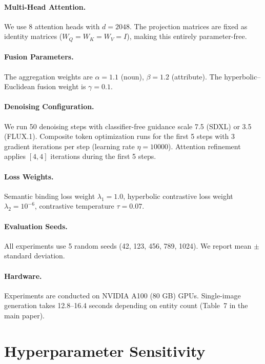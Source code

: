 \documentclass[sigconf,nonacm]{acmart}
\begin{document}
\paragraph{Multi-Head Attention.} We use 8 attention heads with $d=2048$. The projection matrices are fixed as identity matrices ($W_Q = W_K = W_V = I$), making this entirely parameter-free.

\paragraph{Fusion Parameters.} The aggregation weights are $\alpha = 1.1$ (noun), $\beta = 1.2$ (attribute). The hyperbolic--Euclidean fusion weight is $\gamma = 0.1$.

\paragraph{Denoising Configuration.} We run 50 denoising steps with classifier-free guidance scale 7.5 (SDXL) or 3.5 (FLUX.1). Composite token optimization runs for the first 5 steps with 3 gradient iterations per step (learning rate $\eta = 10000$). Attention refinement applies $[4, 4]$ iterations during the first 5 steps.

\paragraph{Loss Weights.} Semantic binding loss weight $\lambda_1 = 1.0$, hyperbolic contrastive loss weight $\lambda_2 = 10^{-6}$, contrastive temperature $\tau = 0.07$.

\paragraph{Evaluation Seeds.} All experiments use 5 random seeds (42, 123, 456, 789, 1024). We report mean $\pm$ standard deviation.

\paragraph{Hardware.} Experiments are conducted on NVIDIA A100 (80 GB) GPUs. Single-image generation takes 12.8--16.4 seconds depending on entity count (Table~7 in the main paper).

\section{Hyperparameter Sensitivity}
\label{sec:hyperparam}
\end{document}

